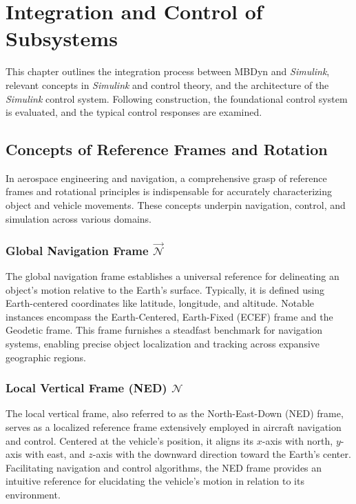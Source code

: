 \chapter{Integration and Control of Subsystems}

This chapter outlines the integration process between MBDyn and \textit{Simulink}, relevant concepts in \textit{Simulink} and control theory, and the architecture of the \textit{Simulink} control system. Following construction, the foundational control system is evaluated, and the typical control responses are examined.

\section{Concepts of Reference Frames and Rotation}

In aerospace engineering and navigation, a comprehensive grasp of reference frames and rotational principles is indispensable for accurately characterizing object and vehicle movements. These concepts underpin navigation, control, and simulation across various domains.

\subsection[Global Navigation Frame N]{Global Navigation Frame $\overrightarrow{\mathcal{N}}$}

The global navigation frame establishes a universal reference for delineating an object's motion relative to the Earth's surface. Typically, it is defined using Earth-centered coordinates like latitude, longitude, and altitude. Notable instances encompass the Earth-Centered, Earth-Fixed (ECEF) frame and the Geodetic frame. This frame furnishes a steadfast benchmark for navigation systems, enabling precise object localization and tracking across expansive geographic regions.

\subsection[Local Vertical Frame (NED)]{Local Vertical Frame (NED) $\mathcal{N}$}

The local vertical frame, also referred to as the North-East-Down (NED) frame, serves as a localized reference frame extensively employed in aircraft navigation and control. Centered at the vehicle's position, it aligns its $x$-axis with north, $y$-axis with east, and $z$-axis with the downward direction toward the Earth's center. Facilitating navigation and control algorithms, the NED frame provides an intuitive reference for elucidating the vehicle's motion in relation to its environment.

